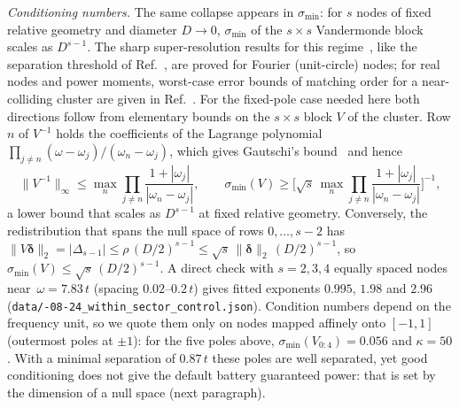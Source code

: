 \documentclass[submission, PhysCore]{SciPost}
\begin{document}
\begin{appendix}
\emph{Conditioning numbers.} The same collapse appears in $\sigma_{\min}$: for $s$ nodes of fixed relative geometry and diameter $D\to0$, $\sigma_{\min}$ of the $s\times s$ Vandermonde block scales as $D^{s-1}$. The sharp super-resolution results for this regime~\cite{BatenkovClustered2020,KunisNagel2021,Donoho1992}, like the separation threshold of Ref.~\cite{Moitra2015}, are proved for Fourier (unit-circle) nodes; for real nodes and power moments, worst-case error bounds of matching order for a near-colliding cluster are given in Ref.~\cite{AkinshinGoldmanYomdin2021}. For the fixed-pole case needed here both directions follow from elementary bounds on the $s\times s$ block $V$ of the cluster. Row $n$ of $V^{-1}$ holds the coefficients of the Lagrange polynomial $\prod_{j\ne n}(\omega-\omega_j)/(\omega_n-\omega_j)$, which gives Gautschi's bound~\cite{Gautschi1962,Gautschi1963} and hence
\[
\|V^{-1}\|_\infty\le\max_n\prod_{j\ne n}\frac{1+|\omega_j|}{|\omega_n-\omega_j|},\qquad
\sigma_{\min}(V)\ge\Big[\sqrt{s}\,\max_n\prod_{j\ne n}\frac{1+|\omega_j|}{|\omega_n-\omega_j|}\Big]^{-1},
\]
a lower bound that scales as $D^{s-1}$ at fixed relative geometry. Conversely, the redistribution that spans the null space of rows $0,\dots,s-2$ has $\|V\bm{\delta}\|_2=|\Delta_{s-1}|\le\rho\,(D/2)^{s-1}\le\sqrt{s}\,\|\bm{\delta}\|_2\,(D/2)^{s-1}$, so $\sigma_{\min}(V)\le\sqrt{s}\,(D/2)^{s-1}$. A direct check with $s=2,3,4$ equally spaced nodes near~${\omega=7.83\,t}$ (spacing $0.02$--$0.2\,t$) gives fitted exponents $0.995$, $1.98$ and $2.96$ (\texttt{data/-08-24\_within\_sector\_control.json}). Condition numbers depend on the frequency unit, so we quote them only on nodes mapped affinely onto $[-1,1]$ (outermost poles at $\pm1$): for the five poles above, $\sigma_{\min}(V_{0:4})=0.056$ and $\kappa=50$. With a minimal separation of $0.87\,t$ these poles are well separated, yet good conditioning does not give the default battery guaranteed power: that is set by the dimension of a null space (next paragraph).


\end{appendix}
\end{document}
